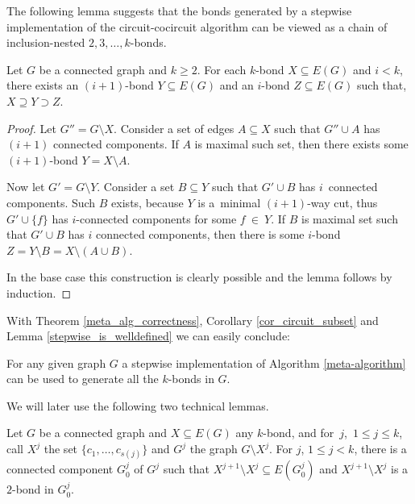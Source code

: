 The following lemma suggests that the bonds generated by \linebreak a stepwise implementation of the circuit-cocircuit algorithm can be viewed as a chain of inclusion-nested $2,3,\ldots,k$-bonds.

\begin{lem}
	\label{stepwise_is_welldefined}
	Let $G$ be a connected graph and $k \geq 2$. For each $k$-bond $X \subseteq E(G)$ and $i < k$, there exists an $(i+1)$-bond $Y \subseteq E(G)$ and an $i$-bond $Z \subseteq E(G)$ such that, $X \supseteq Y \supset Z$.
\end{lem}

\begin{proof}
	Let $G'' = G \setminus X$. Consider a set of edges $A \subseteq X$ such that $G'' \cup A$ has $(i+1)$ connected components. If $A$ is maximal such set, then there exists some $(i+1)$-bond $Y = X \setminus A$.

	Now let $G' = G \setminus Y$. Consider a set $B \subseteq Y$ such that $G' \cup B$ has $i$~connected components. Such $B$ exists, because $Y$ is a~minimal $(i+1)$-way cut, thus $G' \cup \{f\}$ has $i$-connected components for some $f~\in~Y$. If $B$ is maximal set such that $G' \cup B$ has $i$ connected components, then there is some $i$-bond $Z = Y \setminus B = X \setminus (A \cup B)$.

	In the base case this construction is clearly possible and the \linebreak lemma follows by induction.
\end{proof}

With Theorem \ref{meta_alg_correctness}, Corollary \ref{cor_circuit_subset} and Lemma \ref{stepwise_is_welldefined} we can easily conclude:

\begin{claim}
	For any given graph $G$ a stepwise implementation of Algorithm \ref{meta-algorithm} can be used to generate all the $k$-bonds in $G$.
\end{claim}

\clearpage

\noindent We will later use the following two technical lemmas.

\begin{lem}
	\label{stepwise_2bond}
	Let $G$ be a connected graph and $X \subseteq E(G)$ any $k$-bond, and for~$j$,~$1 \leq j \leq k$, call $X^j$ the set $\{c_1,\ldots,c_{s(j)}\}$ and $G^j$ the graph $G \setminus X^{j}$. For $j$, $1 \leq j < k$, there is a connected component $G_0^j$ of $G^j$ such that $X^{j+1} \setminus X^{j} \subseteq E(G_0^j)$ and $X^{j+1} \setminus X^j$ is a $2$-bond in $G_0^j$.
\end{lem}

